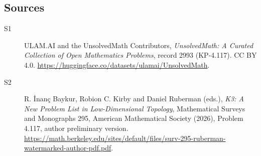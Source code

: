\documentclass[11pt]{article}
\begin{document}
\subsection{Sources}
\begin{description}
\item[\hypertarget{source:2993:1}{S1}] ULAM.AI and the UnsolvedMath Contributors, \emph{UnsolvedMath: A Curated Collection of Open Mathematics Problems}, record 2993 (KP-4.117). CC BY 4.0. \url{https://huggingface.co/datasets/ulamai/UnsolvedMath}.
\item[\hypertarget{source:2993:2}{S2}] R. İnanç Baykur, Robion C. Kirby and Daniel Ruberman (eds.), \emph{K3: A New Problem List in Low-Dimensional Topology}, Mathematical Surveys and Monographs 295, American Mathematical Society (2026), Problem 4.117, author preliminary version. \url{https://math.berkeley.edu/sites/default/files/surv-295-ruberman-watermarked-author-pdf.pdf}.
\end{description}
\label{end:2993}
\end{document}
